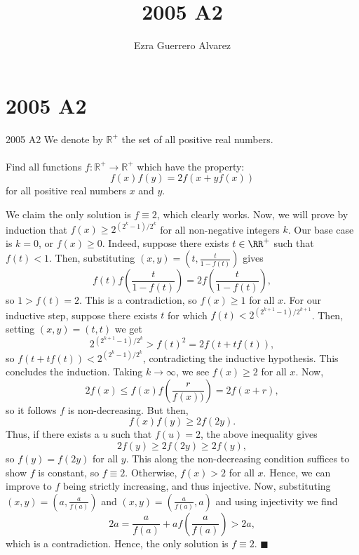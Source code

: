 \documentclass[14pt]{article}
\title{2005 A2}
\author{Ezra Guerrero Alvarez}
\begin{document}
\maketitle
	
\section*{2005 A2}

\begin{statement}{2005 A2}
	We denote by $\mathbb{R}^+$ the set of all positive real numbers. \\\\
	Find all functions $f: \mathbb R^ + \rightarrow\mathbb R^ +$ which have the property:
	\[ f(x)f(y)=2f(x+yf(x)) \]
	for all positive real numbers $x$ and $y$.
\end{statement}
We claim the only solution is $f\equiv2$, which clearly works. Now, we will prove by induction that $f(x)\ge 2^{(2^k-1)/2^k}$ for all non-negative integers $k$. Our base case is $k=0$, or $f(x)\ge0$. Indeed, suppose there exists $t\in\RR^+$ such that $f(t)<1$. Then, substituting $(x,y)=\left(t,\frac t{1-f(t)}\right)$ gives
\[ f(t)f\left(\frac t{1-f(t)}\right)=2f\left(\frac t{1-f(t)}\right), \]
so $1>f(t)=2$. This is a contradiction, so $f(x)\ge1$ for all $x$. For our inductive step, suppose there exists $t$ for which $f(t)<2^{(2^{k+1}-1)/2^{k+1}}$. Then, setting $(x,y)=(t,t)$ we get
\[ 2^{(2^{k+1}-1)/2^k}>f(t)^2=2f(t+tf(t)), \]
so $f(t+tf(t))<2^{(2^k-1)/2^k}$, contradicting the inductive hypothesis. This concludes the induction. Taking $k\to\infty$, we see $f(x)\ge2$ for all $x$. Now,
\[ 2f(x)\le f(x)f\left(\frac r{f(x))}\right)=2f(x+r), \]
so it follows $f$ is non-decreasing. But then,
\[ f(x)f(y)\ge2f(2y). \]
Thus, if there exists a $u$ such that $f(u)=2$, the above inequality gives
\[ 2f(y)\ge 2f(2y)\ge 2f(y), \]
so $f(y)=f(2y)$ for all $y$. This along the non-decreasing condition suffices to show $f$ is constant, so $f\equiv 2$. Otherwise, $f(x)>2$ for all $x$. Hence, we can improve to $f$ being strictly increasing, and thus injective. Now, substituting $(x,y)=\left(a,\frac a{f(a)}\right)$ and $(x,y)=\left(\frac a{f(a)},a\right)$ and using injectivity we find
\[ 2a=\frac a{f(a)}+af\left(\frac a{f(a)}\right)>2a, \]
which is a contradiction. Hence, the only solution is $f\equiv 2$. $\blacksquare$
	
\end{document}
